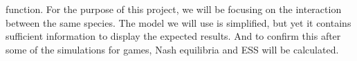 function. For the purpose of this project, we will be focusing on the interaction between the same species. The model we will use is simplified, but yet it contains sufficient information to display the expected results. And to confirm this after some of the simulations for games, Nash equilibria and ESS will be calculated.
